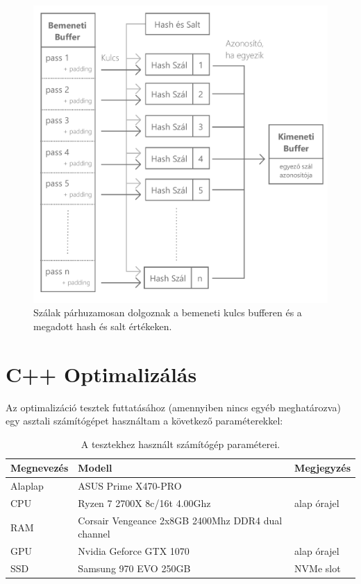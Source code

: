 \begin{figure}[H]
    \centering
    \includegraphics[width=\textwidth]{images/pdf/parallel-cracking.pdf}
    \caption{Szálak párhuzamosan dolgoznak a bemeneti kulcs bufferen és a megadott hash és salt értékeken.}
\end{figure}










\section{C++ Optimalizálás}

Az optimalizáció tesztek futtatásához (amennyiben nincs egyéb meghatározva) egy asztali számítógépet használtam a következő paraméterekkel:

\begin{table}[h]
\centering
    \begin{tabular}{|l|l|l|}
        \hline
        \textbf{Megnevezés} & \textbf{Modell} & \textbf{Megjegyzés} \\
        \hline
        Alaplap & ASUS Prime X470-PRO & \\
        \hline
        CPU & Ryzen 7 2700X 8c/16t 4.00Ghz & alap órajel \\
        \hline
        RAM & Corsair Vengeance 2x8GB 2400Mhz DDR4 dual channel & \\
        \hline
        GPU & Nvidia Geforce GTX 1070 & alap órajel \\
        \hline
        SSD & Samsung 970 EVO 250GB & NVMe slot \\
        \hline
    \end{tabular}
    \caption{A tesztekhez használt számítógép paraméterei.}
\end{table}


